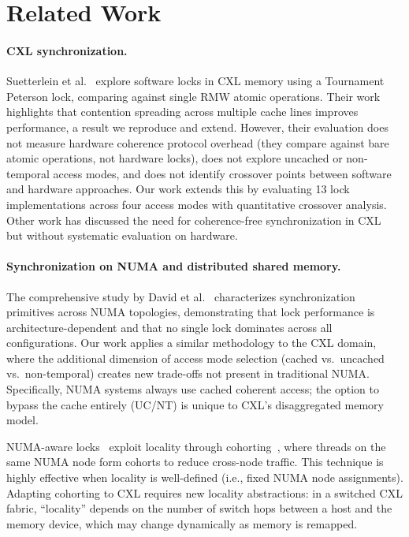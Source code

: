 \section{Related Work}

\paragraph{CXL synchronization.}
Suetterlein et al.~\cite{suetterleinSynchronizationCXLBased2024} explore software locks in CXL memory using a Tournament Peterson lock, comparing against single RMW atomic operations.
Their work highlights that contention spreading across multiple cache lines improves performance, a result we reproduce and extend.
However, their evaluation does not measure hardware coherence protocol overhead (they compare against bare atomic operations, not hardware locks), does not explore uncached or non-temporal access modes, and does not identify crossover points between software and hardware approaches.
Our work extends this by evaluating 13 lock implementations across four access modes with quantitative crossover analysis.
Other work has discussed the need for coherence-free synchronization in CXL~\cite{hongDawnDisaggregationCoherence2025,10.1145/3678015.3680494} but without systematic evaluation on hardware.

\paragraph{Synchronization on NUMA and distributed shared memory.}
The comprehensive study by David et al.~\cite{davidEverythingYouAlways2013} characterizes synchronization primitives across NUMA topologies, demonstrating that lock performance is architecture-dependent and that no single lock dominates across all configurations.
Our work applies a similar methodology to the CXL domain, where the additional dimension of access mode selection (cached vs.\ uncached vs.\ non-temporal) creates new trade-offs not present in traditional NUMA.
Specifically, NUMA systems always use cached coherent access; the option to bypass the cache entirely (UC/NT) is unique to CXL's disaggregated memory model.

NUMA-aware locks~\cite{diceCompactNUMAAwareLocks2019,luchangcoHierarchicalCLHQueue2006,chabbiHighPerformanceLocks2015} exploit locality through cohorting~\cite{diceLockCohortingGeneral}, where threads on the same NUMA node form cohorts to reduce cross-node traffic.
This technique is highly effective when locality is well-defined (i.e., fixed NUMA node assignments).
Adapting cohorting to CXL requires new locality abstractions: in a switched CXL fabric, ``locality'' depends on the number of switch hops between a host and the memory device, which may change dynamically as memory is remapped.

